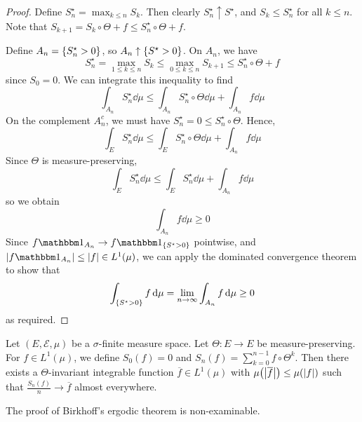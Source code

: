 \begin{proof}
    Define \( S_n^\star = \max_{k \leq n} S_k \).
    Then clearly \( S_n^\star \uparrow S^\star \), and \( S_k \leq S_n^\star \) for all \( k \leq n \).
    Note that \( S_{k+1} = S_k \circ \Theta + f \leq S_n^\star \circ \Theta + f \).

    Define \( A_n = \qty{S_n^\star > 0} \), so \( A_n \uparrow \qty{S^\star > 0} \).
    On \( A_n \), we have
    \[ S_n^\star = \max_{1 \leq k \leq n} S_k \leq \max_{0 \leq k \leq n} S_{k+1} \leq S_n^\star \circ \Theta + f \]
    since \( S_0 = 0 \).
    We can integrate this inequality to find
    \[ \int_{A_n} S_n^\star \dd{\mu} \leq \int_{A_n} S_n^\star \circ \Theta \dd{\mu} + \int_{A_n} f \dd{\mu} \]
    On the complement \( A_n^c \), we must have \( S_n^\star = 0 \leq S_n^\star \circ \Theta \).
    Hence,
    \[ \int_E S_n^\star \dd{\mu} \leq \int_E S_n^\star \circ \Theta \dd{\mu} + \int_{A_n} f \dd{\mu} \]
    Since \( \Theta \) is measure-preserving,
    \[ \int_E S_n^\star \dd{\mu} \leq \int_E S_n^\star \dd{\mu} + \int_{A_n} f \dd{\mu} \]
    so we obtain
    \[ \int_{A_n} f \dd{\mu} \geq 0 \]
    Since \( f \mathbbm 1_{A_n} \to f \mathbbm 1_{\qty{S^\star > 0}} \) pointwise, and \( \abs{f \mathbbm 1_{A_n}} \leq \abs{f} \in L^1(\mu) \), we can apply the dominated convergence theorem to show that
    \[ \int_{\qty{S^\star > 0}} f \dd{\mu} = \lim_{n \to \infty} \int_{A_n} f \dd{\mu} \geq 0 \]
    as required.
\end{proof}
\begin{theorem}[Birkhoff]
	Let \( (E, \mathcal E, \mu) \) be a \( \sigma \)-finite measure space.
	Let \( \Theta \colon E \to E \) be measure-preserving.
	For \( f \in L^1(\mu) \), we define \( S_0(f) = 0 \) and \( S_n(f) = \sum_{k=0}^{n-1} f \circ \Theta^k \).
	Then there exists a \( \Theta \)-invariant integrable function \( \overline f \in L^1(\mu) \) with \( \mu\qty(\abs{\overline f}) \leq \mu(\abs{f}) \) such that \( \frac{S_n(f)}{n} \to \overline f \) almost everywhere.
\end{theorem}
The proof of Birkhoff's ergodic theorem is non-examinable.
